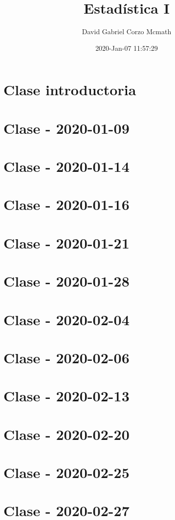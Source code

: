\documentclass{book}
\title{Estadística I }
\author{David Gabriel Corzo Mcmath}
\date{2020-Jan-07 11:57:29}
\begin{document}
\maketitle
\tableofcontents

\chapter{Clase introductoria}


\chapter{Clase - 2020-01-09}


\chapter{Clase - 2020-01-14}


\chapter{Clase - 2020-01-16}


\chapter{Clase - 2020-01-21}


\chapter{Clase - 2020-01-28}


\chapter{Clase - 2020-02-04}


\chapter{Clase - 2020-02-06}


\chapter{Clase - 2020-02-13}


\chapter{Clase - 2020-02-20}


\chapter{Clase - 2020-02-25}


\chapter{Clase - 2020-02-27}

\end{document}
